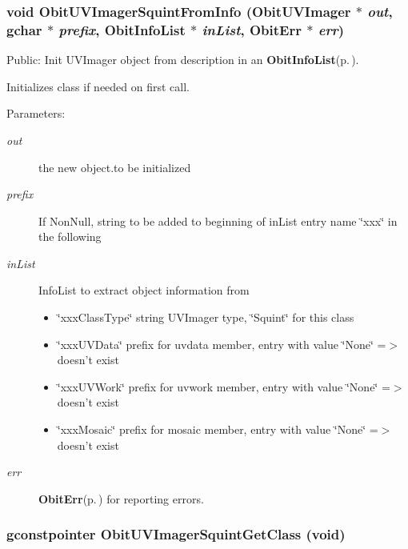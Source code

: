 \subsubsection{\setlength{\rightskip}{0pt plus 5cm}void Obit\-UVImager\-Squint\-From\-Info ({\bf Obit\-UVImager} $\ast$ {\em out}, gchar $\ast$ {\em prefix}, {\bf Obit\-Info\-List} $\ast$ {\em in\-List}, {\bf Obit\-Err} $\ast$ {\em err})}\label{ObitUVImagerSquint_8c_a7}


Public: Init UVImager object from description in an {\bf Obit\-Info\-List}{\rm (p.\,\pageref{structObitInfoList})}. 

Initializes class if needed on first call. \begin{Desc}
\item[Parameters:]
\begin{description}
\item[{\em out}]the new object.to be initialized \item[{\em prefix}]If Non\-Null, string to be added to beginning of in\-List entry name \char`\"{}xxx\char`\"{} in the following \item[{\em in\-List}]Info\-List to extract object information from \begin{itemize}
\item \char`\"{}xxx\-Class\-Type\char`\"{} string UVImager type, \char`\"{}Squint\char`\"{} for this class \item \char`\"{}xxx\-UVData\char`\"{} prefix for uvdata member, entry with value \char`\"{}None\char`\"{} =$>$ doesn't exist \item \char`\"{}xxx\-UVWork\char`\"{} prefix for uvwork member, entry with value \char`\"{}None\char`\"{} =$>$ doesn't exist \item \char`\"{}xxx\-Mosaic\char`\"{} prefix for mosaic member, entry with value \char`\"{}None\char`\"{} =$>$ doesn't exist \end{itemize}
\item[{\em err}]{\bf Obit\-Err}{\rm (p.\,\pageref{structObitErr})} for reporting errors. \end{description}
\end{Desc}
\subsubsection{\setlength{\rightskip}{0pt plus 5cm}gconstpointer Obit\-UVImager\-Squint\-Get\-Class (void)}\label{ObitUVImagerSquint_8c_a8}


